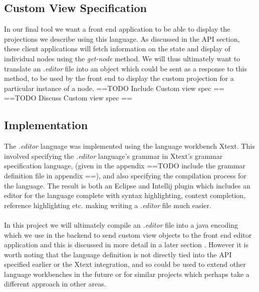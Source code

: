 \documentclass{report}
\begin{document}
\subsection{Custom View Specification}
In our final tool we want a front end application to be able to display the projections we describe using this language. As discussed in the API section, these client applications will fetch information on the state and display of individual nodes using the \emph{get-node} method. We will thus ultimately want to translate an \emph{.editor} file into an object which could be sent as a response to this method, to be used by the front end to display the custom projection for a particular instance of a node.
==TODO Include Custom view spec ==
==TODO Discuss Custom view spec == 


\subsection{Implementation}
The \emph{.editor} language was implemented using the language workbench Xtext. This involved specifying the \emph{.editor} language's grammar in Xtext's grammar specification language, (given in the appendix ==TODO include the grammar definition file in appendix ==), and also specifying the compilation process for the language. The result is both an Eclipse and Intellij plugin which includes an editor for the language complete with syntax highlighting, context completion, reference highlighting etc. making writing a \emph{.editor} file much easier.
\\
\\
In this project we will ultimately compile an \emph{.editor} file into a java encoding which we use in the backend to send custom view objects to the front end editor application and this is discussed in more detail in a later section . However it is worth noting that the language definition is not directly tied into the API specified earlier or the Xtext integration, and so could be used to extend other language workbenches in the future or for similar projects which perhaps take a different approach in other areas.
%
%
\end{document}
